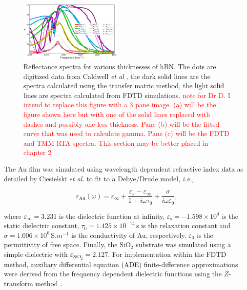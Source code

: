 \documentclass[./JimHeneghanDissertation.tex]{subfiles}
\begin{document}
				\begin{figure}[!htb]
				  \centering\includegraphics[width=0.45\textwidth]{Figures/CaldTMFDTD_hBN.png}
				  \caption{Reflectance spectra for various thicknesses of hBN. The dots are digitized data from Caldwell \textit{et al} \cite{Caldwell:14}, the dark solid lines are the spectra calculated using the transfer matric method, the light solid lines are spectra calculated from FDTD simulations. \textcolor{red}{note for Dr D. I intend to replace this figure with a 3 pane image. (a) will be the figure shown here but with one of the solid lines replaced with dashes and possibly one less thickness. Pane (b) will be the fitted curve that was used to calculate gamma. Pane (c) will be the FDTD and TMM RTA spectra. This section may be better placed in chapter 2}
				  }
				  \label{fig:2a}
				\end{figure}


		 	The Au film was simulated using wavelength dependent refractive index data as detailed by Ciesielski \textit{et al.}  \cite{Ciesielski:18} to fit to a Debye/Drude model, \textit{i.e.,}
			
			\begin{equation}
			  \varepsilon_\mathrm{Au}(\omega) = \varepsilon_\infty + \frac{\varepsilon_s - \varepsilon_\infty}{1+i\omega\tau_0} + \frac{\sigma}{i\omega\varepsilon_0},
			\end{equation}

			\noindent
			where $\varepsilon_\infty = 3.231$ is the dielectric function at infinity, $\varepsilon_\mathrm{s} = -1.598\times 10^4$ is the static dielectric constant, $\tau_0 =1.425\times 10^{-14}\,\si{\s}$ is the relaxation constant and $\sigma = 1.006\times 10^6\,\si{\siemens.m^{-1}}$ is the conductivity of Au, respectively. $\varepsilon_0$ is the permittivity of free space.
			Finally, the $\mathrm{SiO}_{2}$ substrate was simulated using a simple dielectric with $\varepsilon_\mathrm{SiO_2} = 2.127$. For implementation within the FDTD method, auxiliary differential equation (ADE) finite-difference approximations were derived from  the frequency dependent dielectric functions using the $Z$-transform method \cite{Sullivan:96,Sullivan:13}.
\end{document}
